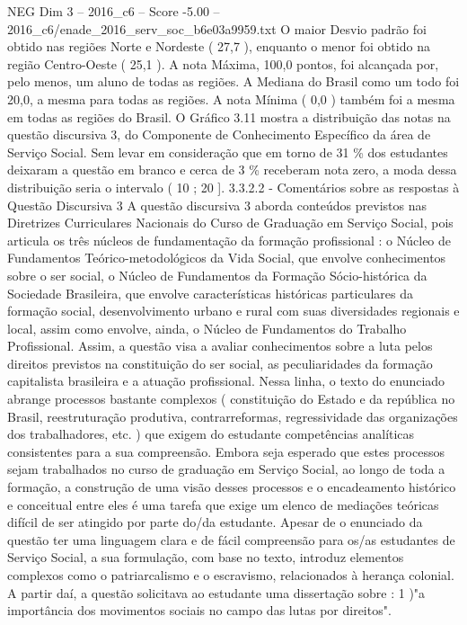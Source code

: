 \begin{textsample}{NEG Dim 3 – 2016\_c6 – Score -5.00 – 2016\_c6/enade\_2016\_serv\_soc\_b6e03a9959.txt}
O maior Desvio padrão foi obtido nas regiões Norte e Nordeste ( 27,7 ), enquanto o menor foi obtido na região Centro-Oeste ( 25,1 ).
A nota Máxima, 100,0 pontos, foi alcançada por, pelo menos, um aluno de todas as regiões.
A Mediana do Brasil como um todo foi 20,0, a mesma para todas as regiões.
A nota Mínima ( 0,0 ) também foi a mesma em todas as regiões do Brasil.
O Gráfico 3.11 mostra a distribuição das notas na questão discursiva 3, do Componente de Conhecimento Específico da área de Serviço Social.
Sem levar em consideração que em torno de 31 \% dos estudantes deixaram a questão em branco e cerca de 3 \% receberam nota zero, a moda dessa distribuição seria o intervalo ( 10 ; 20 ]. 3.3.2.2 - Comentários sobre as respostas à Questão Discursiva 3 A questão discursiva 3 aborda conteúdos previstos nas Diretrizes Curriculares Nacionais do Curso de Graduação em Serviço Social, pois articula os três núcleos de fundamentação da formação profissional : o Núcleo de Fundamentos Teórico-metodológicos da Vida Social, que envolve conhecimentos sobre o ser social, o Núcleo de Fundamentos da Formação Sócio-histórica da Sociedade Brasileira, que envolve características históricas particulares da formação social, desenvolvimento urbano e rural com suas diversidades regionais e local, assim como envolve, ainda, o Núcleo de Fundamentos do Trabalho Profissional.
Assim, a questão visa a avaliar conhecimentos sobre a luta pelos direitos previstos na constituição do ser social, as peculiaridades da formação capitalista brasileira e a atuação profissional.
Nessa linha, o texto do enunciado abrange processos bastante complexos ( constituição do Estado e da república no Brasil, reestruturação produtiva, contrarreformas, regressividade das organizações dos trabalhadores, etc. ) que exigem do estudante competências analíticas consistentes para a sua compreensão.
Embora seja esperado que estes processos sejam trabalhados no curso de graduação em Serviço Social, ao longo de toda a formação, a construção de uma visão desses processos e o encadeamento histórico e conceitual entre eles é uma tarefa que exige um elenco de mediações teóricas difícil de ser atingido por parte do/da estudante.
Apesar de o enunciado da questão ter uma linguagem clara e de fácil compreensão para os/as estudantes de Serviço Social, a sua formulação, com base no texto, introduz elementos complexos como o patriarcalismo e o escravismo, relacionados à herança colonial.
A partir daí, a questão solicitava ao estudante uma dissertação sobre : 1 )"a importância dos movimentos sociais no campo das lutas por direitos".

\end{textsample}
